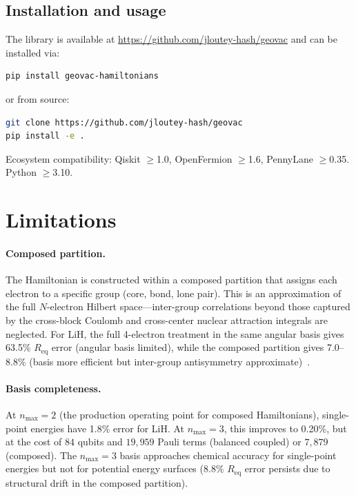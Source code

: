 \documentclass[twocolumn,pra,amsmath,amssymb,superscriptaddress]{revtex4-2}
\begin{document}
\subsection{Installation and usage}

The library is available at
\url{https://github.com/jloutey-hash/geovac}
and can be installed via:
\begin{lstlisting}[language=bash]
pip install geovac-hamiltonians
\end{lstlisting}
or from source:
\begin{lstlisting}[language=bash]
git clone https://github.com/jloutey-hash/geovac
pip install -e .
\end{lstlisting}

Ecosystem compatibility: Qiskit $\geq$1.0, OpenFermion $\geq$1.6,
PennyLane $\geq$0.35. Python $\geq$3.10.

\section{Limitations}
\label{sec:limitations}

\paragraph{Composed partition.}
The Hamiltonian is constructed within a composed partition that assigns
each electron to a specific group (core, bond, lone pair).  This is
an approximation of the full $N$-electron Hilbert space---inter-group
correlations beyond those captured by the cross-block Coulomb and
cross-center nuclear attraction integrals are neglected.  For LiH,
the full 4-electron treatment in the same angular basis gives 63.5\%
$R_{\text{eq}}$ error (angular basis limited), while the composed
partition gives 7.0--8.8\% (basis more efficient but inter-group
antisymmetry approximate)~\cite{GeoVac_Paper17}.

\paragraph{Basis completeness.}
At $n_{\max}=2$ (the production operating point for composed
Hamiltonians), single-point energies have 1.8\% error for LiH.
At $n_{\max}=3$, this improves to 0.20\%, but at the cost of
$84$ qubits and $19{,}959$ Pauli terms (balanced coupled) or
$7{,}879$ (composed).  The $n_{\max}=3$ basis approaches
chemical accuracy for single-point energies but not for
potential energy surfaces (8.8\% $R_{\text{eq}}$ error persists
due to structural drift in the composed partition).
\end{document}
